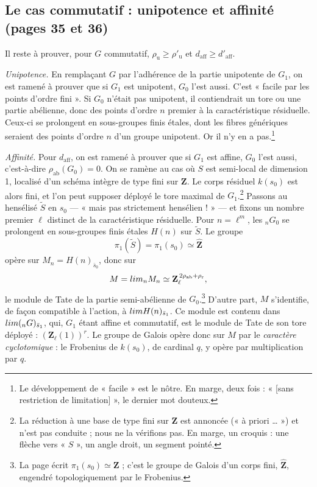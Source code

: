 \documentclass[11pt,a4paper]{article}
\begin{document}
\subsection*{Le cas commutatif : unipotence et affinité (pages 35 et 36)}

Il reste à prouver, pour $G$ commutatif, $\rho_{\mathrm{u}} \geqslant
\rho'_{\mathrm{u}}$ et $d_{\mathrm{aff}} \geqslant d'_{\mathrm{aff}}$.

\emph{Unipotence.} En remplaçant $G$ par l'adhérence de la partie unipotente
de $G_{1}$, on est ramené à prouver que si $G_{1}$ est unipotent, $G_{0}$
l'est aussi. C'est « facile par les points d'ordre fini ». Si $G_{0}$ n'était
pas unipotent, il contiendrait un tore ou une partie abélienne, donc des
points d'ordre $n$ premier à la caractéristique résiduelle. Ceux-ci se
prolongent en sous-groupes finis étales, dont les fibres génériques seraient
des points d'ordre $n$ d'un groupe unipotent. Or il n'y en a pas.\footnote{Le
développement de « facile » est le nôtre. En marge, deux fois :
« [sans restriction de limitation] », le dernier mot douteux.}

\emph{Affinité.} Pour $d_{\mathrm{aff}}$, on est ramené à prouver que si $G_{1}$
est affine, $G_{0}$ l'est aussi, c'est-à-dire $\rho_{\mathrm{ab}}(G_{0}) = 0$.
On se ramène au cas où $S$ est semi-local de dimension 1, localisé d'un schéma
intègre de type fini sur $\mathbf{Z}$. Le corps résiduel $k(s_{0})$ est alors
fini, et l'on peut supposer déployé le tore maximal de $G_{1}$.\footnote{La
réduction à une base de type fini sur $\mathbf{Z}$ est annoncée
(« à priori … ») et n'est pas conduite ; nous ne la vérifions pas. En marge,
un croquis : une flèche vers « $S$ », un angle droit, un segment pointé.}
Passons au hensélisé $\tilde S$ en $s_{0}$ — « mais pas strictement
hensélien ! » — et fixons un nombre premier $\ell$ distinct de la
caractéristique résiduelle. Pour $n = \ell^{m}$, les ${}_{n}G_{0}$ se
prolongent en sous-groupes finis étales $H(n)$ sur $\tilde S$. Le groupe
\[
  \pi_{1}(\tilde S) = \pi_{1}(s_{0}) \simeq \hat{\mathbf{Z}}
\]
opère sur $M_{n} = H(n)_{\bar s_{0}}$, donc sur
\[
  M = \varprojlim_{n} M_{n} \simeq
  \mathbf{Z}_{\ell}^{\,2\rho_{\mathrm{ab}} + \rho_{\mathrm{r}}} ,
\]
le module de Tate de la partie semi-abélienne de $G_{0}$.\footnote{La page
écrit $\pi_{1}(s_{0}) \simeq \mathbf{Z}$ ; c'est le groupe de Galois d'un corps
fini, $\hat{\mathbf{Z}}$, engendré topologiquement par le Frobenius.} D'autre
part, $M$ s'identifie, de façon compatible à l'action, à
$\varprojlim H(n)_{\bar s_{1}}$. Ce module est contenu dans
$\varprojlim ({}_{n}G)_{\bar s_{1}}$, qui, $G_{1}$ étant affine et
commutatif, est le module de Tate de son tore déployé :
$(\mathbf{Z}_{\ell}(1))^{r}$. Le groupe de Galois opère donc sur $M$ par le
\emph{caractère cyclotomique} : le Frobenius de $k(s_{0})$, de cardinal $q$,
y opère par multiplication par $q$.
\end{document}
